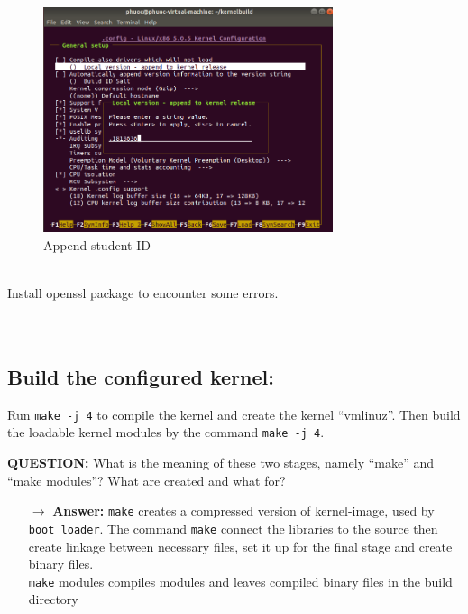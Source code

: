 \documentclass[a4paper]{article}
\begin{document}
\begin{figure}[h!]
\begin{center}
\includegraphics[width=8.5cm]{2.png}
\caption{Append student ID}
\end{center}
\end{figure}
\\
Install openssl package to encounter some errors. \\
\noindent{}\\
\\
\subsection{Build the configured kernel:}
Run \texttt{make -j 4} to compile the kernel and create the kernel ``vmlinuz''. Then build the loadable kernel modules by the command \texttt{make -j 4}.\\
\begin{mdframed}[hidealllines=true,backgroundcolor=blue!10]
\textbf{QUESTION:} What is the meaning of these two stages, namely “make” and “make modules”? What are created and what for?
\begin{itemize}
\item[$\rightarrow$] \textbf{Answer:} \texttt{make} creates a compressed version of kernel-image, used by \texttt{boot loader}. The command \texttt{make} connect the libraries to the source then create linkage between necessary files, set it up for the final stage and create binary files.\\
\texttt{make} modules compiles modules and leaves compiled binary files in the build directory
\end{itemize}
\end{mdframed}
\end{document}
